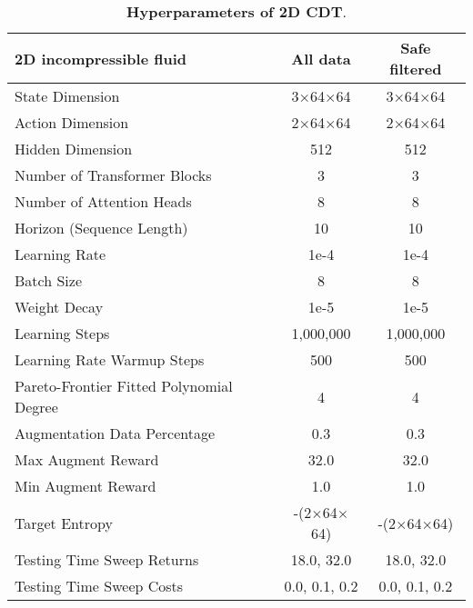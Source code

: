 \begin{table}[ht]
  \begin{center}
    \caption{\textbf{Hyperparameters of 2D CDT}.}
     \label{tab:2d_cdt}
    \begin{tabular}{l|c|c}
    \hline
    {2D incompressible fluid} & {All data} & {Safe filtered} \\
    \hline
    State Dimension                          & 3$\times$64$\times$64    & 3$\times$64$\times$64    \\
    Action Dimension                         & 2$\times$64$\times$64    & 2$\times$64$\times$64    \\
    Hidden Dimension                         & 512                      & 512                      \\
    Number of Transformer Blocks             & 3                        & 3                        \\
    Number of Attention Heads                & 8                        & 8                        \\
    Horizon (Sequence Length)                & 10                       & 10                       \\
    Learning Rate                            & 1e-4                     & 1e-4                     \\
    Batch Size                               & 8                        & 8                        \\
    Weight Decay                             & 1e-5                     & 1e-5                     \\
    Learning Steps                           & 1,000,000                & 1,000,000                \\
    Learning Rate Warmup Steps               & 500                      & 500                      \\
    Pareto-Frontier Fitted Polynomial Degree & 4                        & 4                        \\
    Augmentation Data Percentage             & 0.3                      & 0.3                      \\
    Max Augment Reward                       & 32.0                     & 32.0                     \\
    Min Augment Reward                       & 1.0                      & 1.0                      \\
    Target Entropy                           & -(2$\times$64$\times$64) & -(2$\times$64$\times$64) \\
    Testing Time Sweep Returns               & 18.0, 32.0               & 18.0, 32.0               \\
    Testing Time Sweep Costs                 & 0.0, 0.1, 0.2            & 0.0, 0.1, 0.2            \\ \hline
    \end{tabular}
  \end{center}
\end{table}

